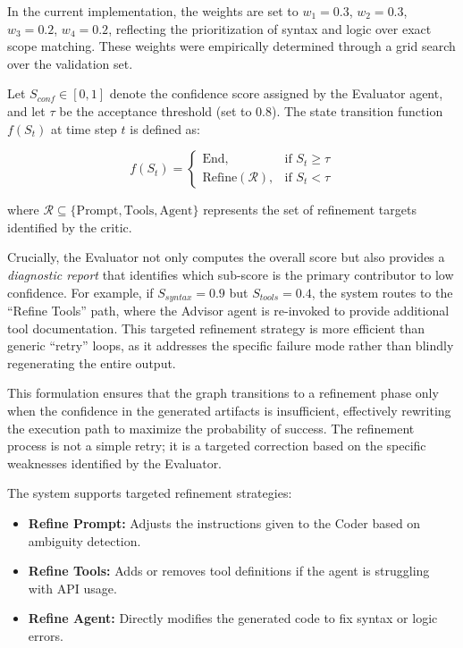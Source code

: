 \documentclass[lettersize,journal]{IEEEtran}
\begin{document}
In the current implementation, the weights are set to $w_1 = 0.3$, $w_2 = 0.3$, $w_3 = 0.2$, $w_4 = 0.2$, reflecting the prioritization of syntax and logic over exact scope matching. These weights were empirically determined through a grid search over the validation set.


Let $S_{conf} \in [0, 1]$ denote the confidence score assigned by the Evaluator agent, and let $\tau$ be the acceptance threshold (set to 0.8). The state transition function $f(S_{t})$ at time step $t$ is defined as:

\begin{equation}
\label{eq:transition}
f(S_{t}) =
\begin{cases}
\text{End}, & \text{if } S_{t} \geq \tau \\
\text{Refine}(\mathcal{R}), & \text{if } S_{t} < \tau
\end{cases}
\end{equation}

where $\mathcal{R} \subseteq \{\text{Prompt}, \text{Tools}, \text{Agent}\}$ represents the set of refinement targets identified by the critic.

Crucially, the Evaluator not only computes the overall score but also provides a \textit{diagnostic report} that identifies which sub-score is the primary contributor to low confidence. For example, if $S_{syntax} = 0.9$ but $S_{tools} = 0.4$, the system routes to the ``Refine Tools'' path, where the Advisor agent is re-invoked to provide additional tool documentation. This targeted refinement strategy is more efficient than generic ``retry'' loops, as it addresses the specific failure mode rather than blindly regenerating the entire output.

This formulation ensures that the graph transitions to a refinement phase only when the confidence in the generated artifacts is insufficient, effectively rewriting the execution path to maximize the probability of success. The refinement process is not a simple retry; it is a targeted correction based on the specific weaknesses identified by the Evaluator.


The system supports targeted refinement strategies:
\begin{itemize}
    \item \textbf{Refine Prompt:} Adjusts the instructions given to the Coder based on ambiguity detection.
    \item \textbf{Refine Tools:} Adds or removes tool definitions if the agent is struggling with API usage.
    \item \textbf{Refine Agent:} Directly modifies the generated code to fix syntax or logic errors.
\end{itemize}
\end{document}
